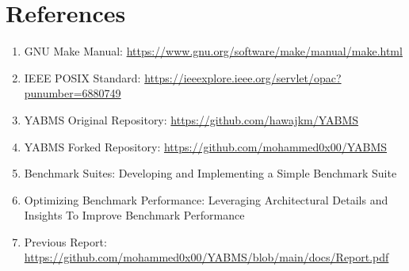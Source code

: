 \documentclass[12pt]{article}
\begin{document}
\section{References}
\begin{enumerate}
    \item GNU Make Manual: \url{https://www.gnu.org/software/make/manual/make.html}
    \item IEEE POSIX Standard: \url{https://ieeexplore.ieee.org/servlet/opac?punumber=6880749}
    \item YABMS Original Repository: \url{https://github.com/hawajkm/YABMS}
    \item YABMS Forked Repository: \url{https://github.com/mohammed0x00/YABMS}
    \item Benchmark Suites: Developing and Implementing a Simple Benchmark Suite
    \item Optimizing Benchmark Performance: Leveraging Architectural Details and Insights To Improve Benchmark Performance
    \item Previous Report: \url{https://github.com/mohammed0x00/YABMS/blob/main/docs/Report.pdf}
\end{enumerate}
\end{document}
